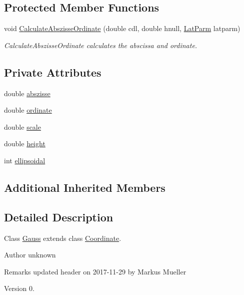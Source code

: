 \subsection*{Protected Member Functions}
\begin{DoxyCompactItemize}
\item 
void \hyperlink{classcoordinates_1_1_gauss_a1e810f7e3af643a8c0525485d9133276}{Calculate\+Abszisse\+Ordinate} (double cdl, double hnull, \hyperlink{classparams_1_1_lat_parm}{Lat\+Parm} latparm)
\begin{DoxyCompactList}\small\item\em Calculate\+Abszisse\+Ordinate calculates the abscissa and ordinate. \end{DoxyCompactList}\end{DoxyCompactItemize}
\subsection*{Private Attributes}
\begin{DoxyCompactItemize}
\item 
double \hyperlink{classcoordinates_1_1_gauss_a9bd37a096f53a9e443570ec5748f95d8}{abszisse}
\item 
double \hyperlink{classcoordinates_1_1_gauss_ab156b1da518d7637dacef40489a0dba4}{ordinate}
\item 
double \hyperlink{classcoordinates_1_1_gauss_aea6297c71e9258a7dfb80a823048dc0d}{scale}
\item 
double \hyperlink{classcoordinates_1_1_gauss_ad1543fe8a30e7f6dab1d0486bb5a935d}{height}
\item 
int \hyperlink{classcoordinates_1_1_gauss_a08582ecf17604f8330df079ce234008c}{ellipsoidal}
\end{DoxyCompactItemize}
\subsection*{Additional Inherited Members}


\subsection{Detailed Description}
Class \hyperlink{classcoordinates_1_1_gauss}{Gauss} extends class \hyperlink{classcoordinates_1_1_coordinate}{Coordinate}. 

\begin{DoxyAuthor}{Author}
unknown 
\end{DoxyAuthor}
\begin{DoxyRemark}{Remarks}
updated header on 2017-\/11-\/29 by Markus Mueller 
\end{DoxyRemark}
\begin{DoxyVersion}{Version}
0. 
\end{DoxyVersion}

